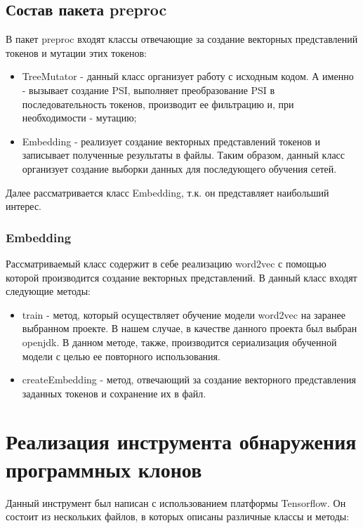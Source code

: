 \subsection{Состав пакета preproc}

В пакет preproc	входят классы отвечающие за создание векторных представлений токенов и мутации этих токенов:

\begin{itemize}
\setlength\itemsep{0mm}
\item TreeMutator - данный класс организует работу с исходным кодом. А именно - вызывает создание PSI, выполняет преобразование PSI в последовательность токенов, производит ее фильтрацию и, при необходимости - мутацию;
\item Embedding - реализует создание векторных представлений токенов и записывает полученные результаты в файлы. Таким образом, данный класс организует создание выборки данных для последующего обучения сетей.
\end{itemize}

Далее рассматривается класс Embedding, т.к. он представляет наибольший интерес.

\subsubsection{Embedding}

Рассматриваемый класс содержит в себе реализацию word2vec с помощью которой производится создание векторных представлений. В данный класс входят следующие методы:

\begin{itemize}
\setlength\itemsep{0mm}
\item train - метод, который осуществляет обучение модели word2vec на заранее выбранном проекте. В нашем случае, в качестве данного проекта был выбран openjdk. В данном методе, также, производится сериализация обученной модели с целью ее повторного использования. 
\item createEmbedding - метод, отвечающий за создание векторного представления заданных токенов и сохранение их в файл.
\end{itemize}

\section{Реализация инструмента обнаружения программных клонов}

Данный инструмент был написан с использованием платформы Tensorflow. Он состоит из нескольких файлов, в которых описаны различные классы и методы:

